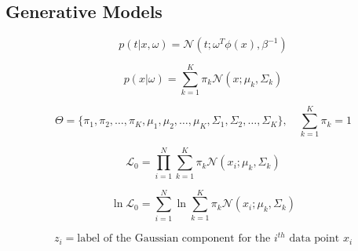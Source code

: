 \documentclass[10pt]{article}
\begin{document}
\begin{multicols}{2}
\section*{Generative Models}

\begin{equation}
    \label{eq:generative}
    p(t | x, \omega) = \mathcal{N}(t ; \omega^{T}\phi(x), \beta^{-1})
\end{equation}

\begin{equation*}
    p(x | \omega) = \sum_{k=1}^{K} \pi_{k} \mathcal{N}(x ; \mu_{k}, \Sigma_{k})
\end{equation*}

\begin{equation*}
    \Theta = \{ \pi_{1}, \pi_{2}, \ldots, \pi_{K}, \mu_{1}, \mu_{2}, \ldots, \mu_{K}, \Sigma_{1}, \Sigma_{2}, \ldots, \Sigma_{K} \}, \quad \sum_{k=1}^{K} \pi_{k} = 1
\end{equation*}


\begin{equation*} \label{eq:observed-likelihood}
    \mathcal{L}_0 = \prod_{i=1}^{N} \sum_{k=1}^{K} \pi_{k} \mathcal{N}(x_i ; \mu_{k}, \Sigma_{k})
\end{equation*}

\begin{equation*} \label{eq:log-likelihood}
    \ln \mathcal{L}_0 = \sum_{i=1}^{N} \ln \sum_{k=1}^{K} \pi_{k} \mathcal{N}(x_i ; \mu_{k}, \Sigma_{k})
\end{equation*}

\begin{equation*} \label{eq:hidden-latent}
    z_{i} = \text{label of the Gaussian component for the $i^{th}$ data point $x_i$}
\end{equation*}
    

\end{multicols}
\end{document}
